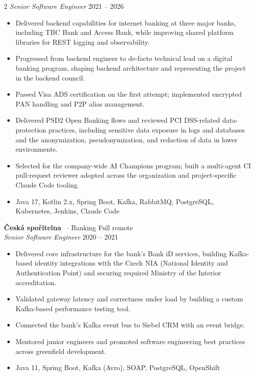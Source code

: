 \documentclass[10pt]{article}
\newcommand{\companyentry}[3]{%
\textbf{#1}%
\if\relax\detokenize{#2}\relax\else\ $\cdot$ #2\fi%
\hfill #3%
}
\newcommand{\roleentry}[2]{%
\textit{#1} \hfill #2%
}
\begin{document}
\begin{paracol}{2}
\roleentry{Senior Software Engineer}{2021 -- 2026}
\begin{itemize}[noitemsep,leftmargin=3.5mm,rightmargin=0mm,topsep=3pt]
  \item Delivered backend capabilities for internet banking at three major banks, including TBC Bank and Access Bank,
  while improving shared platform libraries for REST logging and observability.
  \item Progressed from backend engineer to de-facto technical lead on a digital banking program, shaping backend
  architecture and representing the project in the backend council.
  \item Passed Visa ADS certification on the first attempt; implemented encrypted PAN handling and P2P alias management.
  \item Delivered PSD2 Open Banking flows and reviewed PCI DSS-related data-protection practices, including sensitive
  data exposure in logs and databases and the anonymization, pseudonymization, and redaction of data in lower
  environments.
  \item Selected for the company-wide AI Champions program; built a multi-agent CI pull-request reviewer adopted across
  the organization and project-specific Claude Code tooling.
  \item Java 17, Kotlin 2.x, Spring Boot, Kafka, RabbitMQ, PostgreSQL, Kubernetes, Jenkins, Claude Code
\end{itemize}

\smallskip

\companyentry{Česká spořitelna}{Banking}{Full remote}\\[2pt]

\roleentry{Senior Software Engineer}{2020 -- 2021}
\begin{itemize}[noitemsep,leftmargin=3.5mm,rightmargin=0mm,topsep=3pt]
  \item Delivered core infrastructure for the bank's Bank iD services, building Kafka-based identity integrations with
  the Czech NIA (National Identity and Authentication Point) and securing required Ministry of the Interior
  accreditation.
  \item Validated gateway latency and correctness under load by building a custom Kafka-based performance testing tool.
  \item Connected the bank's Kafka event bus to Siebel CRM with an event bridge.
  \item Mentored junior engineers and promoted software engineering best practices across greenfield development.
  \item Java 11, Spring Boot, Kafka (Avro), SOAP, PostgreSQL, OpenShift
\end{itemize}


\end{paracol}
\end{document}
